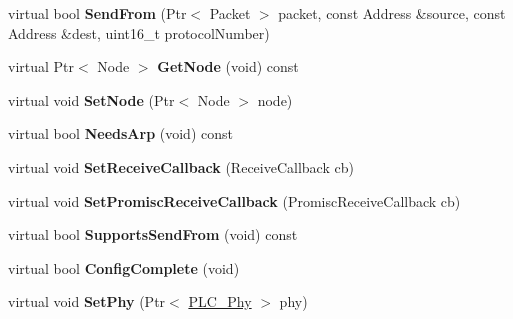 \begin{DoxyCompactItemize}
\item 
\hypertarget{classns3_1_1PLC__NetDevice_a6898af3925d464ddc215a2772fb01956}{virtual bool {\bfseries \-Send\-From} (\-Ptr$<$ \-Packet $>$ packet, const \-Address \&source, const \-Address \&dest, uint16\-\_\-t protocol\-Number)}\label{classns3_1_1PLC__NetDevice_a6898af3925d464ddc215a2772fb01956}

\item 
\hypertarget{classns3_1_1PLC__NetDevice_ad1538d05274eea9f4fd0585673396641}{virtual \-Ptr$<$ \-Node $>$ {\bfseries \-Get\-Node} (void) const }\label{classns3_1_1PLC__NetDevice_ad1538d05274eea9f4fd0585673396641}

\item 
\hypertarget{classns3_1_1PLC__NetDevice_a3a774052a0e0d9c98d08728ecc88ae2f}{virtual void {\bfseries \-Set\-Node} (\-Ptr$<$ \-Node $>$ node)}\label{classns3_1_1PLC__NetDevice_a3a774052a0e0d9c98d08728ecc88ae2f}

\item 
\hypertarget{classns3_1_1PLC__NetDevice_a850ca983ecbef1b8ae72dff28fc37442}{virtual bool {\bfseries \-Needs\-Arp} (void) const }\label{classns3_1_1PLC__NetDevice_a850ca983ecbef1b8ae72dff28fc37442}

\item 
\hypertarget{classns3_1_1PLC__NetDevice_a81c473d1d27059a399268e92899d7705}{virtual void {\bfseries \-Set\-Receive\-Callback} (\-Receive\-Callback cb)}\label{classns3_1_1PLC__NetDevice_a81c473d1d27059a399268e92899d7705}

\item 
\hypertarget{classns3_1_1PLC__NetDevice_a98e383b6ccbcc10a092b7667931d3e73}{virtual void {\bfseries \-Set\-Promisc\-Receive\-Callback} (\-Promisc\-Receive\-Callback cb)}\label{classns3_1_1PLC__NetDevice_a98e383b6ccbcc10a092b7667931d3e73}

\item 
\hypertarget{classns3_1_1PLC__NetDevice_a4a223518e776c4d4285246a6f3590834}{virtual bool {\bfseries \-Supports\-Send\-From} (void) const }\label{classns3_1_1PLC__NetDevice_a4a223518e776c4d4285246a6f3590834}

\item 
\hypertarget{classns3_1_1PLC__NetDevice_a77d7296092861fb3c00db750cb2dc3ea}{virtual bool {\bfseries \-Config\-Complete} (void)}\label{classns3_1_1PLC__NetDevice_a77d7296092861fb3c00db750cb2dc3ea}

\item 
\hypertarget{classns3_1_1PLC__NetDevice_ad5e9cde04b9995d40804086babccd61c}{virtual void {\bfseries \-Set\-Phy} (\-Ptr$<$ \hyperlink{classns3_1_1PLC__Phy}{\-P\-L\-C\-\_\-\-Phy} $>$ phy)}\label{classns3_1_1PLC__NetDevice_ad5e9cde04b9995d40804086babccd61c}


\end{DoxyCompactItemize}
